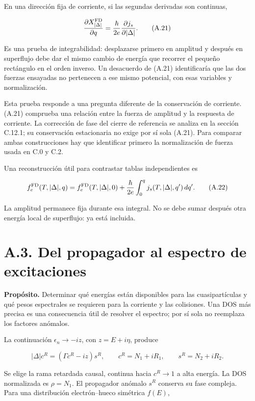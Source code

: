 \documentclass[
  spanish,
  10pt,
  a4paper,
]{article}
\begin{document}
En una dirección fija de corriente, si las segundas derivadas son
continuas,

\[
\frac{\partial X_{|\Delta|}^{\rm FD}}{\partial q}
=\frac{\hbar}{2e}\frac{\partial j_s}{\partial|\Delta|}.
\tag{A.21}
\]

Es una prueba de integrabilidad: desplazarse primero en amplitud y
después en superflujo debe dar el mismo cambio de energía que recorrer
el pequeño rectángulo en el orden inverso. Un desacuerdo de (A.21)
identificaría que las dos fuerzas ensayadas no pertenecen a ese mismo
potencial, con esas variables y normalización.

Esta prueba responde a una pregunta diferente de la conservación de
corriente. (A.21) comprueba una relación entre la fuerza de amplitud y
la respuesta de corriente. La corrección de fase del cierre de
referencia se analiza en la sección C.12.1; su conservación estacionaria
no exige por sí sola (A.21). Para comparar ambas construcciones hay que
identificar primero la normalización de fuerza usada en C.0 y C.2.

Una reconstrucción útil para contrastar tablas independientes es

\[
f_e^{\rm FD}(T,|\Delta|,q)
=f_e^{\rm FD}(T,|\Delta|,0)
+\frac{\hbar}{2e}\int_0^q j_s(T,|\Delta|,q')\,dq'.
\tag{A.22}
\]

La amplitud permanece fija durante esa integral. No se debe sumar
después otra energía local de superflujo: ya está incluida.

\section{A.3. Del propagador al espectro de
excitaciones}\label{a.3.-del-propagador-al-espectro-de-excitaciones}

\textbf{Propósito.} Determinar qué energías están disponibles para las
cuasipartículas y qué pesos espectrales se requieren para la corriente y
las colisiones. Una DOS más precisa es una consecuencia útil de resolver
el espectro; por sí sola no reemplaza los factores anómalos.

La continuación \(\epsilon_n\to-iz\), con \(z=E+i\eta\), produce

\[
|\Delta|c^R=(\Gamma c^R-iz)s^R,
\qquad c^R=N_1+iR_1,\qquad s^R=N_2+iR_2.
\tag{A.23}
\]

Se elige la rama retardada causal, continua hacia \(c^R\to1\) a alta
energía. La DOS normalizada es \(\rho=N_1\). El propagador anómalo
\(s^R\) conserva su fase compleja. Para una distribución electrón--hueco
simétrica \(f(E)\),
\end{document}
